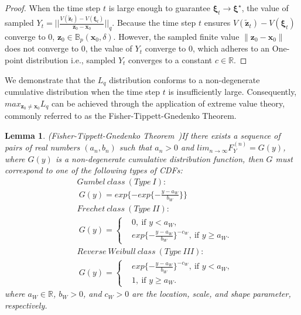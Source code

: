 \documentclass[conference]{IEEEtran}
\newtheorem{lemma}{\bf Lemma}
\newtheorem{proof}{\bf Proof}
\newcommand{\myvec}[1]{\boldsymbol{#1}}
\newcommand{\bbB}{\mathbb{B}}
\newcommand{\bbR}{\mathbb{R}}
\begin{document}
\begin{proof}
  When the time step $t$ is large enough 
  to guarantee $\myvec{\xi}_{t} \to \myvec{\xi}^{\star}$, 
  the value of sampled 
  $Y_{t} = 
  ||\frac{V(\tilde{\myvec{z}}_{t})-V(\myvec{\xi}_{t})}{\myvec{z}_{0} - \myvec{x}_{0}}||_{q}$. 
  Because the time step $t$ ensures 
  $V(\tilde{\myvec{z}}_{t}) - V(\myvec{\xi}_{t})$ 
  converge to $0$, 
  $\myvec{z}_{0} \in \bbB_{p}(\myvec{x}_{0},\delta)$. 
  However, the sampled finite value $\lVert \myvec{z}_{0} - \myvec{x}_{0} \rVert$ does not converge to $0$, 
  the value of $Y_{t}$ converge to $0$, which adheres to 
  an One-point distribution i.e., sampled $Y_{t}$ converges to a constant $c\in \bbR$. 
\end{proof}

We demonstrate that the $L_{q}$ distribution conforms to 
a non-degenerate cumulative distribution when the time 
step $t$ is insufficiently large. 
Consequently, $max_{\myvec{z}_{0}\neq\myvec{x}_{0}}L_{q}$ 
can be achieved through the application of extreme 
value theory, commonly referred to as the 
Fisher-Tippett-Gnedenko Theorem.

\begin{lemma}(Fisher-Tippett-Gnedenko Theorem~\cite{smith1990extreme})\label{lemma:mle}
  If there exists a sequence of pairs of real numbers 
  $(a_{n},b_{n})$ such that $a_{n}>0$ and 
  $lim_{n\to \infty}F_{Y}^{(n)} = G(y)$, 
  where $G(y)$ is a non-degenerate cumulative 
  distribution function, then $G$ must correspond 
  to one of the following types of CDFs: 
  \begin{equation*}
    \begin{aligned}
      &Gumbel\ class\ (Type\ I):\\ 
      &\ G(y) = exp\{
        -exp\{ -\frac{y-a_{W}}{b_{W}} \}
      \} \\
      &Frechet\ class\ (Type\ II):\\
      &\ G(y) = \left\{
        \begin{split}
            &0, \ \text{if } y < a_{W}, \\
            &exp\{ -\frac{y-a_{W}}{b_{W}} \}^{-c_{W}}, \ \text{if } y \geq a_{W}.
        \end{split}
        \right. \\
      &Reverse\ Weibull\ class\ (Type\ III):\\ 
      &\ G(y) = \left\{
        \begin{split}
            &exp\{ -\frac{y-a_{W}}{b_{W}} \}^{-c_{W}}, \ \text{if } y < a_{W}, \\
            &1, \ \text{if } y \geq a_{W}.
        \end{split}
        \right. 
    \end{aligned}
  \end{equation*}
  where $a_{W}\in \bbR$, $b_{W} > 0$, and $c_{W} > 0$ 
  are the location, scale, and shape parameter, respectively. 
\end{lemma}
\end{document}
